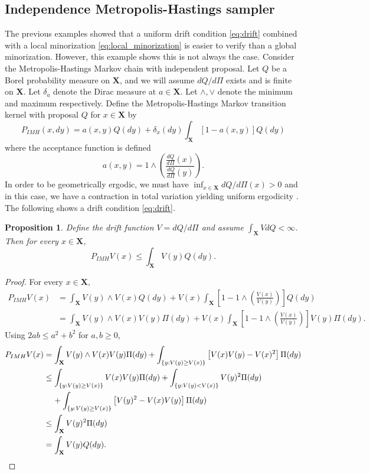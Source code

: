 \documentclass[ejsv2, noshowframe]{imsart}
\theoremstyle{plain}
\newtheorem{proposition}[theorem]{Proposition}
\theoremstyle{definition}
\theoremstyle{remark}
\renewcommand{\P}{P}
\newcommand{\X}{\textbf{X}}
\begin{document}
\subsection{Independence Metropolis-Hastings sampler} \label{example:imh}

The previous examples showed that a uniform drift condition \eqref{eq:drift} combined with a local minorization \eqref{eq:local_minorization} is easier to verify than a global minorization.
However, this example shows this is not always the case.
Consider the Metropolis-Hastings Markov chain with independent proposal.
Let $Q$ be a Borel probability measure on $\X$, and we will assume $dQ/d\Pi$ exists and is finite on $\X$.
Let $\delta_a$ denote the Dirac measure at $a \in \X$.
Let $\wedge, \vee$ denote the minimum and maximum respectively.
Define the Metropolis-Hastings Markov transition kernel with proposal $Q$ for $x \in \X$ by 
\[
\P_{IMH}(x, dy)
= a(x, y) Q(dy)
+ \delta_x(dy) \int_{\X} \left[ 1 - a(x, y) \right] Q(dy)
\]
where the acceptance function is defined
\[
a(x, y) = 1 \wedge \left( \frac{ \frac{dQ}{d\Pi}(x) }{ \frac{dQ}{d\Pi}(y) } \right).
\]
In order to be geometrically ergodic, we must have $\inf_{x \in \X} dQ/d\Pi(x) > 0$ and in this case, we have a contraction in total variation yielding uniform ergodicity \citep{mengersen:tweedie:1996}.
The following shows a drift condition \eqref{eq:drift}.

\begin{proposition}
\label{proposition:imh_drift}
Define the drift function $V = dQ/d\Pi$ and assume $\int_{\X} V dQ < \infty$.
Then for every $x \in \X$,
\[
\P_{IMH} V(x)
\le \int_{\X} V(y) Q(dy).
\]
\end{proposition}

\begin{proof}
For every $x \in \X$,
\begin{align*}
\P_{IMH} V(x)
&= \int_{\X} V(y) \wedge V(x) Q(dy)
+ V(x) \int_{\X} \left[ 1 - 1 \wedge \left( \frac{ V(x) }{ V(y) } \right) \right] Q(dy) 
\\
&= \int_{\X} V(y) \wedge V(x) V(y) \Pi(dy)
+ V(x) \int_{\X} \left[ 1 - 1 \wedge \left( \frac{ V(x) }{ V(y) } \right) \right] V(y) \Pi(dy). 
\end{align*}
Using $2 ab \le a^2 + b^2$ for $a, b \ge 0$,
\begin{align*}
\P_{IMH} V(x)
&= \int_{\X} V(y) \wedge V(x) V(y) \Pi(dy)
+ \int_{ \{ y : V(y) \ge V(x) \} } \left[ V(x) V(y) - V(x)^2 \right] \Pi(dy)
\\
&\le \int_{ \{ y : V(y) \ge V(x) \} } V(x) V(y) \Pi(dy)
+ \int_{ \{ y : V(y) < V(x) \} } V(y)^2 \Pi(dy)
\\
&\hspace{.4cm}+ \int_{ \{ y : V(y) \ge V(x) \} } \left[ V(y)^2 - V(x) V(y) \right] \Pi(dy)
\\
&\le \int_{\X} V(y)^2 \Pi(dy)
\\
&= \int_{\X} V(y) Q(dy).
\end{align*}
\end{proof}
\end{document}
